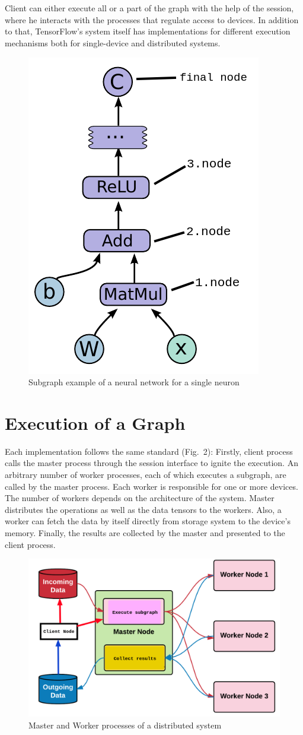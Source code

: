 \documentclass[ieeetran]{article}
\begin{document}
\\ \\Client can either execute all or a part of the graph with the help of the session, where he interacts with the processes that regulate access to devices. In addition to that, TensorFlow's system itself has implementations for different execution mechanisms both for single-device and distributed systems.
\begin{figure}[h!]
  \centering
   \includegraphics[width=0.25\linewidth]{graph}
\caption[placeholder]{Subgraph example of a neural network for a single neuron}
  \label{fig:graph_caption_placeholder_subgraph_example_for_a_neural_networkfootnotemark}
\end{figure}
\section{Execution of a Graph} %
\label{sec:execution_of_a_graph}
Each implementation follows the same standard (Fig.\ 2): Firstly, client process calls the master process through the session interface to ignite the execution. An arbitrary number of worker processes, each of which executes a subgraph, are called by the master process. Each worker is responsible for one or more devices. The number of workers depends on the architecture of the system. Master distributes the operations as well as the data tensors to the workers. Also, a worker can fetch the data by itself directly from storage system to the device's memory. Finally, the results are collected by the master and presented to the client process.
\begin{figure}[h!]
  \centering
\includegraphics[width=0.5\linewidth]{executionofgraph}
 \caption[placeholder]{Master and Worker processes of a distributed system} 
  \label{fig:executionofgraph}
\end{figure}
\end{document}
